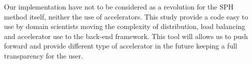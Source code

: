 Our implementation have not to be considered as a revolution for the SPH method itself, neither the use of accelerators. 
This study provide a code easy to use by domain scientists moving the complexity of distribution, load balancing and accelerator use to the back-end framework.
This tool will allows us to push forward and provide different type of accelerator in the future keeping a full transparency for the user. 
